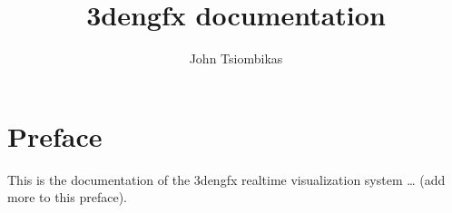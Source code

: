 \documentclass[a4paper,11pt]{book}
\author{John Tsiombikas}
\title{3dengfx documentation}
\begin{document}
\frontmatter
\maketitle

\chapter{Preface}
This is the documentation of the 3dengfx realtime visualization system \ldots
(add more to this preface).

\tableofcontents

\mainmatter




\appendix


\end{document}
